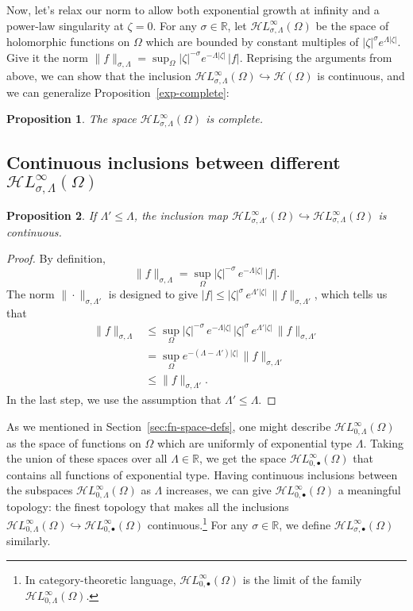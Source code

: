 \documentclass{article}
\theoremstyle{definition}
\theoremstyle{plain}
\newtheorem{prop}{Proposition}
\newcommand{\R}{\mathbb{R}}
\newcommand{\holo}{\mathcal{H}}
\newcommand{\singexp}[2]{\mathcal{H}L^\infty_{#1, #2}}
\newcommand{\singexpalg}[1]{\singexp{#1}{\bullet}}
\newcommand{\domain}{\Omega}
\begin{document}
Now, let's relax our norm to allow both exponential growth at infinity and a power-law singularity at $\zeta = 0$. For any $\sigma \in \R$, let $\singexp{\sigma}{\Lambda}(\Omega)$ be the space of holomorphic functions on $\Omega$ which are bounded by constant multiples of $|\zeta|^\sigma e^{\Lambda|\zeta|}$. Give it the norm $\|f\|_{\sigma,\Lambda} = \sup_\Omega |\zeta|^{-\sigma} e^{-\Lambda|\zeta|}\,|f|$. Reprising the arguments from above, we can show that the inclusion $\singexp{\sigma}{\Lambda}(\Omega) \hookrightarrow \holo(\Omega)$ is continuous, and we can generalize Proposition~\ref{exp-complete}:
\begin{prop}
The space $\singexp{\sigma}{\Lambda}(\Omega)$ is complete.
\end{prop}
\subsection{Continuous inclusions between different $\singexp{\sigma}{\Lambda}(\Omega)$}\label{sec:inclusions}
\begin{prop}\label{prop:inclus-ge-exp}
If $\Lambda'\leq\Lambda$, the inclusion map $\singexp{\sigma}{\Lambda'}(\Omega)\hookrightarrow \singexp{\sigma}{\Lambda}(\Omega)$ is continuous.
\end{prop}
\begin{proof}
By definition,
\[ \|f\|_{\sigma,\Lambda}=\sup_{\Omega} |\zeta|^{-\sigma}\,e^{-\Lambda |\zeta|}\, |f|. \]
The norm $\|\cdot\|_{\sigma, \Lambda'}$ is designed to give $|f| \le |\zeta|^\sigma\,e^{\Lambda'|\zeta|}\,\|f\|_{\sigma, \Lambda'}$, which tells us that
\begin{align*}
\|f\|_{\sigma,\Lambda} & \leq \sup_{\Omega} |\zeta|^{-\sigma}\,e^{-\Lambda |\zeta|}\,|\zeta|^\sigma\,e^{\Lambda'|\zeta|}\,\|f\|_{\sigma, \Lambda'}\\
&=\sup_{\Omega} e^{-(\Lambda-\Lambda') |\zeta|}\,\|f\|_{\sigma, \Lambda'}\\
&\leq \|f\|_{\sigma,\Lambda'}.
\end{align*}
In the last step, we use the assumption that $\Lambda' \le \Lambda$.
\end{proof}
As we mentioned in Section~\ref{sec:fn-space-defs}, one might describe $\singexp{0}{\Lambda}(\domain)$ as the space of functions on $\domain$ which are uniformly of exponential type $\Lambda$. Taking the union of these spaces over all $\Lambda \in \R$, we get the space $\singexpalg{0}(\domain)$ that contains all functions of exponential type. Having continuous inclusions between the subspaces $\singexp{0}{\Lambda}(\domain)$ as $\Lambda$ increases, we can give $\singexpalg{0}(\domain)$ a meaningful topology: the finest topology that makes all the inclusions $\singexp{0}{\Lambda}(\domain) \hookrightarrow \singexpalg{0}(\domain)$ continuous.\footnote{In category-theoretic language, $\singexpalg{0}(\domain)$ is the limit of the family $\singexp{0}{\Lambda}(\domain)$.} For any $\sigma \in \R$, we define $\singexpalg{\sigma}(\domain)$ similarly.
\end{document}
